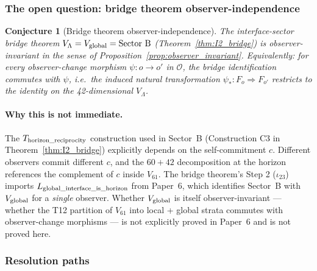 \documentclass[11pt]{article}
\theoremstyle{plain}
\newtheorem{conjecture}[theorem]{Conjecture}
\theoremstyle{definition}
\theoremstyle{remark}
\begin{document}
\subsubsection*{The open question: bridge theorem observer-independence}

\begin{conjecture}[Bridge theorem observer-independence]\label{conj:bridge_observer_indep}
The interface-sector bridge theorem $V_\Lambda = V_{\rm global} = \text{Sector B}$ (Theorem~\ref{thm:I2_bridge}) is observer-invariant in the sense of Proposition~\ref{prop:observer_invariant}.  Equivalently: for every observer-change morphism $\psi : o \to o'$ in $\mathcal{O}$, the bridge identification commutes with $\psi$, i.e.\ the induced natural transformation $\psi_* : F_o \Rightarrow F_{o'}$ restricts to the identity on the 42-dimensional $V_\Lambda$.
\end{conjecture}

\paragraph{Why this is not immediate.}  The $T_{\rm horizon\_reciprocity}$ construction used in Sector~B (Construction C3 in Theorem~\ref{thm:I2_bridge}) explicitly depends on the self-commitment $c$.  Different observers commit different $c$, and the $60 + 42$ decomposition at the horizon references the complement of $c$ inside $V_{61}$.  The bridge theorem's Step 2 ($\iota_{23}$) imports $L_{\rm global\_interface\_is\_horizon}$ from Paper~6, which identifies Sector~B with $V_{\rm global}$ for a \emph{single} observer.  Whether $V_{\rm global}$ is itself observer-invariant --- whether the T12 partition of $V_{61}$ into local + global strata commutes with observer-change morphisms --- is not explicitly proved in Paper~6 and is not proved here.

\subsubsection*{Resolution paths}
\end{document}
